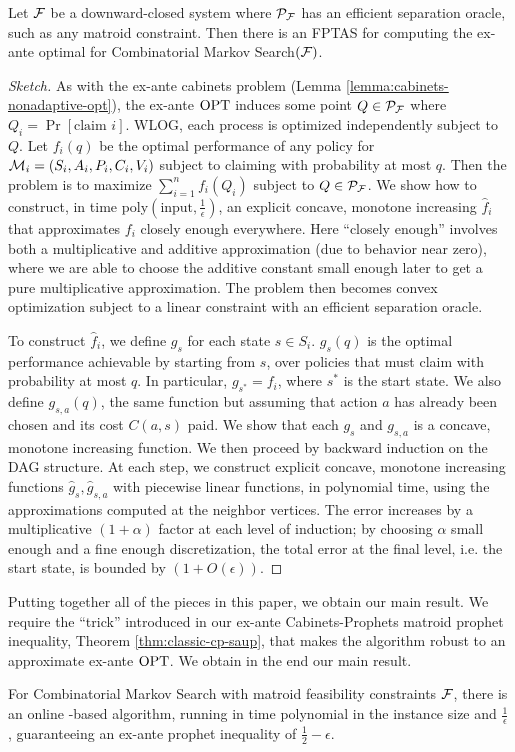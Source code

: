 \begin{proposition} \label{prop:exante-dags-efficient}
  Let $\mathcal{F}$ be a downward-closed system where $\mathcal{P}_{\mathcal{F}}$ has an efficient separation oracle, such as any matroid constraint.
  Then there is an FPTAS for computing the ex-ante optimal for Combinatorial Markov Search$(\mathcal{F})$.
\end{proposition}
\begin{proof}[Sketch]
  As with the ex-ante cabinets problem (Lemma \ref{lemma:cabinets-nonadaptive-opt}), the ex-ante $\mathrm{OPT}$ induces some point $Q \in \mathcal{P}_{\mathcal{F}}$ where $Q_i = \Pr[\text{claim $i$}]$.
  WLOG, each process is optimized independently subject to $Q$.
  Let $f_i(q)$ be the optimal performance of any policy for $\mathcal{M}_i = (S_i,A_i,P_i,C_i,V_i)$ subject to claiming with probability at most $q$.
  Then the problem is to maximize $\sum_{i=1}^n f_i(Q_i)$ subject to $Q \in \mathcal{P}_{\mathcal{F}}$.
  We show how to construct, in time poly$(\text{input}, \tfrac{1}{\epsilon})$, an explicit concave, monotone increasing $\hat{f}_i$ that approximates $f_i$ closely enough everywhere.
  Here ``closely enough'' involves both a multiplicative and additive approximation (due to behavior near zero), where we are able to choose the additive constant small enough later to get a pure multiplicative approximation.
  The problem then becomes convex optimization subject to a linear constraint with an efficient separation oracle.

  To construct $\hat{f}_i$, we define $g_s$ for each state $s \in S_i$.
  $g_s(q)$ is the optimal performance achievable by starting from $s$, over policies that must claim with probability at most $q$.
  In particular, $g_{s^*} = f_i$, where $s^*$ is the start state.
  We also define $g_{s,a}(q)$, the same function but assuming that action $a$ has already been chosen and its cost $C(a,s)$ paid.
  We show that each $g_s$ and $g_{s,a}$ is a concave, monotone increasing function.
  We then proceed by backward induction on the DAG structure.
  At each step, we construct explicit concave, monotone increasing functions $\hat{g}_s,\hat{g}_{s,a}$ with piecewise linear functions, in polynomial time, using the approximations computed at the neighbor vertices.
  The error increases by a multiplicative $(1+\alpha)$ factor at each level of induction; by choosing $\alpha$ small enough and a fine enough discretization, the total error at the final level, i.e. the start state, is bounded by $(1 + O(\epsilon))$.
\end{proof}

Putting together all of the pieces in this paper, we obtain our main result.
We require the ``trick'' introduced in our ex-ante Cabinets-Prophets matroid prophet inequality, Theorem \ref{thm:classic-cp-saup}, that makes the algorithm robust to an approximate ex-ante $\mathrm{OPT}$.
We obtain in the end our main result.
\begin{corollary} \label{cor:dags-matroid-approx}
  For Combinatorial Markov Search with matroid feasibility constraints $\mathcal{F}$, there is an online \SAUP{}-based algorithm, running in time polynomial in the instance size and $\frac{1}{\epsilon}$, guaranteeing an ex-ante prophet inequality of $\frac{1}{2}-\epsilon$.
\end{corollary}
